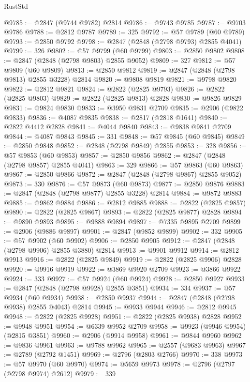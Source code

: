 \begin{lexlean}{RustStd}
\begin{coremodule}
@9785 := @2847 (@9744 @9782) @2814
@9786 := @9743 @9785
@9787 := @9703 @9786
@9788 := @2812 @9787
@9789 := 325
@9792 := @57 @9789 (@60 @9789)
@9793 := @2850 @9792
@9798 := @2847 (@2848 (@2798 @9793) @2855 @4041)
@9799 := 326
@9802 := @57 @9799 (@60 @9799)
@9803 := @2850 @9802
@9808 := @2847 (@2848 (@2798 @9803) @2855 @9052)
@9809 := 327
@9812 := @57 @9809 (@60 @9809)
@9813 := @2850 @9812
@9819 := @2847 (@2848 (@2798 @9813) @2855 @3228) @2814
@9820 := @9808 @9819
@9821 := @9798 @9820
@9822 := @2812 @9821
@9824 := @2822 (@2825 @9793)
@9826 := @2822 (@2825 @9803)
@9829 := @2822 (@2825 @9813) @2828
@9830 := @9826 @9829
@9831 := @9824 @9830
@9833 := @3950 @9831 @2709
@9835 := @2906 (@9822 @9833)
@9836 := @4087 @9835
@9838 := @2817 (@2818 @1641)
@9840 := @2822 @4412 @2828
@9841 := @4044 @9840
@9843 := @9838 @9841 @2709
@9844 := @4087 @9843
@9845 := 331
@9848 := @57 @9845 (@60 @9845)
@9849 := @2850 @9848
@9852 := @2848 (@2798 @9849) @2855
@9853 := 328
@9856 := @57 @9853 (@60 @9853)
@9857 := @2850 @9856
@9862 := @2847 (@2848 (@2798 @9857) @2855 @4041)
@9863 := 329
@9866 := @57 @9863 (@60 @9863)
@9867 := @2850 @9866
@9872 := @2847 (@2848 (@2798 @9867) @2855 @9052)
@9873 := 330
@9876 := @57 @9873 (@60 @9873)
@9877 := @2850 @9876
@9883 := @2847 (@2848 (@2798 @9877) @2855 @3228) @2814
@9884 := @9872 @9883
@9885 := @9862 @9884
@9886 := @2812 @9885
@9888 := @2822 (@2825 @9857)
@9890 := @2822 (@2825 @9867)
@9893 := @2822 (@2825 @9877) @2828
@9894 := @9890 @9893
@9895 := @9888 @9894
@9897 := @7335 @9895 @2709
@9899 := @2906 (@9886 @9897)
@9901 := @2847 (@9852 @9899)
@9902 := 332
@9905 := @57 @9902 (@60 @9902)
@9906 := @2850 @9905
@9912 := @2847 (@2848 (@2798 @9906) @2855 @3880) @2814
@9913 := @9901 @9912
@9914 := @2812 @9913
@9916 := @2822 (@2825 @9849)
@9919 := @2822 (@2825 @9906) @2828
@9920 := @9916 @9919
@9922 := @3869 @9920 @2709
@9923 := @3866 @9922
@9924 := 333
@9927 := @57 @9924 (@60 @9924)
@9928 := @2850 @9927
@9933 := @2847 (@2848 (@2798 @9928) @2855 @3851)
@9934 := 334
@9937 := @57 @9934 (@60 @9934)
@9938 := @2850 @9937
@9944 := @2847 (@2848 (@2798 @9938) @2855 @4043) @2814
@9945 := @9933 @9944
@9946 := @2812 @9945
@9948 := @2822 (@2825 @9928)
@9951 := @2822 (@2825 @9938) @2828
@9952 := @9948 @9951
@9954 := @6339 @9952 @2709
@9958 := @9923 (@9946 @9954) (@2815 @3851)
@9960 := @2906 (@9914 @9958)
@9961 := @9844 @9960
@9962 := @9836 @9961
@9963 := @9788 @9962
@9965 := @2557 (@9683 @9963)
@9967 := @2789 (@2792 @1451)
@9969 := @2796 (@2803 @2766)
@9970 := 338
@9973 := @57 @9970 (@60 @9970)
@9974 := @5659 @9973
@9978 := @2796 (@2797 (@2798 @9974) @2612)
@9979 := 339

\end{coremodule}
\end{lexlean}
